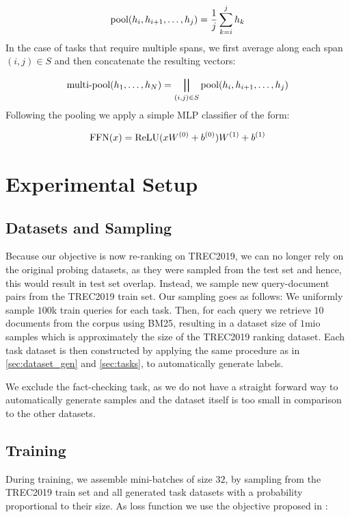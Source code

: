 \begin{equation}
    \text{pool}(h_i, h_{i+1},\dots, h_j)= \frac{1}{j} \sum_{k=i}^j h_k
\end{equation}
In the case of tasks that require multiple spans, we first average along each span $(i,j) \in S$ and then concatenate the resulting vectors:

\begin{equation}
    \text{multi-pool}(h_1, \dots, h_N) = \bigparallel_{(i, j) \in S}{\text{pool}(h_i, h_{i+1},\dots, h_j)}
\end{equation}
Following the pooling we apply a simple MLP classifier of the form:

\begin{equation}
    \text{FFN}(x) = \text{ReLU}(x W^{(0)} + b^{(0)}) W^{(1)} + b^{(1)}
\end{equation}


\section{Experimental Setup}
\subsection{Datasets and Sampling}
Because our objective is now re-ranking on TREC2019, we can no longer rely on the original probing datasets, as they were sampled from the test set and hence, this would result in test set overlap. Instead, we sample new query-document pairs from the TREC2019 train set. Our sampling goes as follows: We uniformly sample $100$k train queries for each task. Then, for each query we retrieve $10$ documents from the corpus using BM25, resulting in a dataset size of $1$mio samples which is approximately the size of the TREC2019 ranking dataset. Each task dataset is then constructed by applying the same procedure as in \autoref{sec:dataset_gen} and \autoref{sec:tasks}, to automatically generate labels.

We exclude the fact-checking task, as we do not have a straight forward way to automatically generate samples and the dataset itself is too small in comparison to the other datasets.

\subsection{Training}
During training, we assemble mini-batches of size $32$, by sampling from the TREC2019 train set and all generated task datasets with a probability proportional to their size. As loss function we use the objective proposed in \cite{aghajanyan-etal-2021-muppet}:

